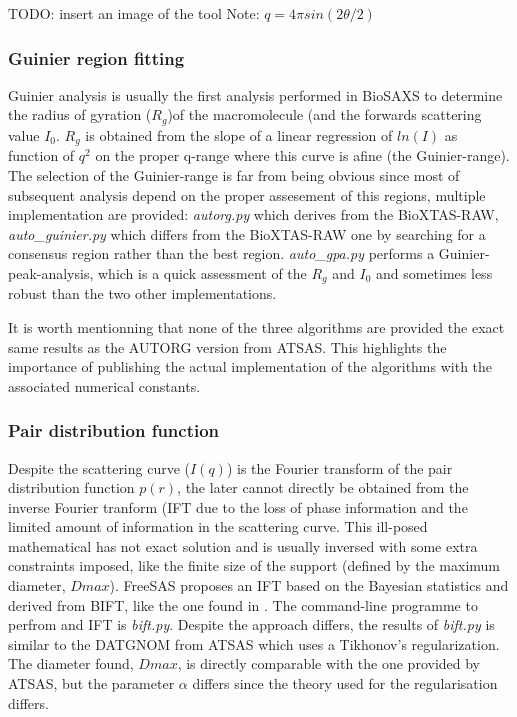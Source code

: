 \documentclass[preprint]{iucr}              %
\begin{document}
TODO: insert an image  of the tool
Note:
$q = 4\pi sin(2\theta/2)$

\subsubsection{Guinier region fitting}
Guinier analysis \cite{guinier} is usually the first analysis performed in BioSAXS to determine the radius of gyration ($R_g$)of the macromolecule (and the forwards scattering value $I_0$.
$R_g$ is obtained from the slope of a linear regression of $ln(I)$ as function of $q^2$ on the proper q-range where this curve is afine (the Guinier-range).
The selection of the Guinier-range is far from being obvious since most of subsequent analysis depend on the proper assesement of this regions, 
multiple implementation are provided: \textit{autorg.py} which derives from the BioXTAS-RAW\cite{bioxtasraw}, \textit{auto_guinier.py} which differs from the BioXTAS-RAW
one by searching for a consensus region rather than the best region. 
\textit{auto_gpa.py} performs a Guinier-peak-analysis\cite{gpa}, which is a quick assessment of the $R_g$ and $I_0$ and sometimes less robust than the two other implementations. 

It is worth mentionning that none of the three algorithms are provided the exact same results as the AUTORG\cite{ATSAS2} version from ATSAS. 
This highlights the importance of publishing the actual implementation of the algorithms with the associated numerical constants.
  
\subsubsection{Pair distribution function}
Despite the scattering curve ($I(q)$) is the Fourier transform of the pair distribution function $p(r)$, the later cannot directly be obtained from the
inverse Fourier tranform (IFT due to the loss of phase information and the limited amount of information in the scattering curve. 
This ill-posed mathematical has not exact solution and is usually inversed with some extra constraints imposed, like the finite size of the support (defined by the maximum diameter, $Dmax$).    
FreeSAS proposes an IFT based on the Bayesian statistics and derived from BIFT\cite{bift}, like the one found in \cite{bioxtasraw}.
The command-line programme to perfrom and IFT is \textit{bift.py}. 
Despite the approach differs, the results of \textit{bift.py} is similar to the DATGNOM\cite{ATSAS1} from ATSAS which uses a Tikhonov's regularization.
The diameter found, $Dmax$, is directly comparable with the one provided by ATSAS, but the parameter $\alpha$ differs since the theory used for the regularisation differs. 
\end{document}
